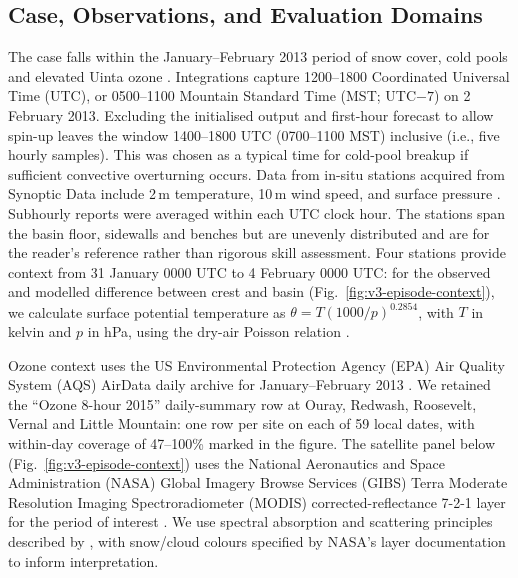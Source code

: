 \documentclass[air,article,submit,moreauthors]{Definitions/mdpi}
\begin{document}
\subsection{Case, Observations, and Evaluation Domains}
\label{sec:v3-case}

The case falls within the January--February 2013 period of snow cover, cold pools and elevated Uinta ozone \citep{Neemann2015-ws,Ahmadov2015-zm,Tran2018FDDA}.
Integrations capture 1200--1800 Coordinated Universal Time (UTC), or 0500--1100 Mountain Standard Time (MST; UTC$-7$) on 2 February 2013.
Excluding the initialised output and first-hour forecast to allow spin-up leaves the window 1400--1800 UTC (0700--1100 MST) inclusive (i.e., five hourly samples).
This was chosen as a typical time for cold-pool breakup if sufficient convective overturning occurs.
Data from in-situ stations acquired from Synoptic Data include 2\,m temperature, 10\,m wind speed, and surface pressure \citep{SynopticTimeseries}.
Subhourly reports were averaged within each UTC clock hour.
The stations span the basin floor, sidewalls and benches but are unevenly distributed and are for the reader's reference rather than rigorous skill assessment.
Four stations provide context from 31 January 0000 UTC to 4 February 0000 UTC: for the observed and modelled difference between crest and basin (Fig.~\ref{fig:v3-episode-context}), we calculate surface potential temperature as $\theta=T(1000/p)^{0.2854}$, with $T$ in kelvin and $p$ in hPa, using the dry-air Poisson relation \citep{WallaceHobbs2006}.

Ozone context uses the US Environmental Protection Agency (EPA) Air Quality System (AQS) AirData daily archive for January--February 2013 \citep{EPAAirData}.
We retained the ``Ozone 8-hour 2015'' daily-summary row at Ouray, Redwash, Roosevelt, Vernal and Little Mountain: one row per site on each of 59 local dates, with within-day coverage of 47--100\% marked in the figure.
The satellite panel below (Fig.~\ref{fig:v3-episode-context}) uses the National Aeronautics and Space Administration (NASA) Global Imagery Browse Services (GIBS) Terra Moderate Resolution Imaging Spectroradiometer (MODIS) corrected-reflectance 7-2-1 layer for the period of interest \citep{NASAGIBS}.
We use spectral absorption and scattering principles described by \citet{Liou2002}, with snow/cloud colours specified by NASA's layer documentation \citep{NASAMODIS721} to inform interpretation.
\end{document}
